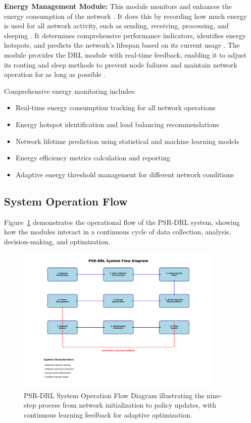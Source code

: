 \textbf{Energy Management Module:}  
This module monitors and enhances the energy consumption of the network \cite{a13030072}. It does this by recording how much energy is used for all network activity, such as sending, receiving, processing, and sleeping \cite{AKKAYA2005325}. It determines comprehensive performance indicators, identifies energy hotspots, and predicts the network's lifespan based on its current usage \cite{7374157}. The module provides the DRL module with real-time feedback, enabling it to adjust its routing and sleep methods to prevent node failures and maintain network operation for as long as possible \cite{9474495}.

Comprehensive energy monitoring includes:
\begin{itemize}
    \item Real-time energy consumption tracking for all network operations
    \item Energy hotspot identification and load balancing recommendations
    \item Network lifetime prediction using statistical and machine learning models
    \item Energy efficiency metrics calculation and reporting
    \item Adaptive energy threshold management for different network conditions
\end{itemize}

\subsection{System Operation Flow}

Figure~\ref{fig:psr_drl_flow} demonstrates the operational flow of the PSR-DRL system, showing how the modules interact in a continuous cycle of data collection, analysis, decision-making, and optimization.

\begin{figure}[htbp]
    \centering
    \includegraphics[width=0.9\textwidth]{All figures/PSR_DRL_Flow_Diagram.pdf}
    \caption{PSR-DRL System Operation Flow Diagram illustrating the nine-step process from network initialization to policy updates, with continuous learning feedback for adaptive optimization.}
    \label{fig:psr_drl_flow}
\end{figure}

